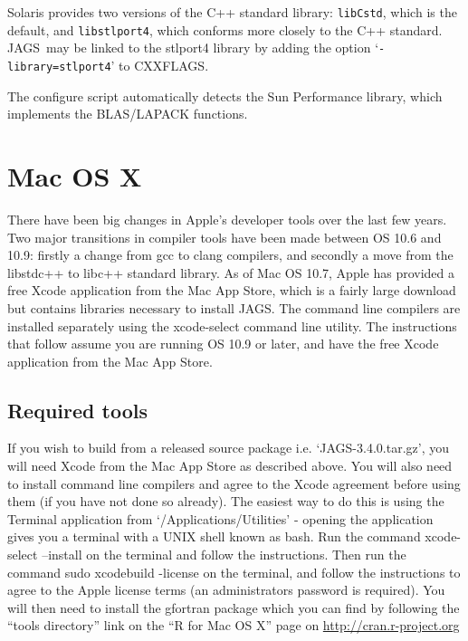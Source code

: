 \documentclass[11pt, a4paper, titlepage]{article}
\newcommand{\release}{3.4.0}
\newcommand{\JAGS}{\textsf{JAGS}}
\newcommand{\code}[1]{{\bgroup{\normalfont\ttfamily #1}\egroup}}
\newcommand{\samp}[1]{{`\bgroup\normalfont\texttt{#1}'\egroup}}
\newcommand{\file}[1]{{`\normalfont\textsf{#1}'}}
\let\option=\samp
\begin{document}
Solaris provides two versions of the C++ standard library:
\texttt{libCstd}, which is the default, and \texttt{libstlport4},
which conforms more closely to the C++ standard. \JAGS\ may be linked
to the stlport4 library by adding the option
\option{-library=stlport4} to \code{CXXFLAGS}. 

The configure script automatically detects the Sun Performance library,
which implements the BLAS/LAPACK functions.  

\clearpage
\section{Mac OS X}

There have been big changes in Apple's developer tools over the last few
years.  Two major transitions in compiler tools have been made between
OS 10.6 and 10.9: firstly a change from gcc to clang compilers, and
secondly a move from the libstdc++ to libc++ standard library.  As of
Mac OS 10.7, Apple has provided a free Xcode application from the Mac
App Store, which is a fairly large download but contains libraries
necessary to install \JAGS. The command line compilers are installed
separately using the \code{xcode-select} command line utility.  The 
instructions that follow assume you are running OS 10.9 or later, and 
have the free Xcode application from the Mac App Store.

\subsection{Required tools}

If you wish to build from a released source package i.e.
\file{JAGS-\release.tar.gz}, you will need Xcode from the Mac App Store
as described above.  You will also need to install command line compilers
and agree to the Xcode agreement before using them (if you have not
done so already). The easiest way to do this is using the Terminal
application from \file{/Applications/Utilities} - opening the
application gives you a terminal with a UNIX shell known as bash.  Run
the command \code{xcode-select --install} on the terminal and follow the
instructions.  Then run the command \code{sudo xcodebuild -license} 
on the terminal, and follow the instructions to agree to the Apple
license terms (an administrators password is required).  You will then
need to install the gfortran package which you can find by following the
``tools directory'' link on the ``R for Mac OS X'' page on
\url{http://cran.r-project.org}
\end{document}
